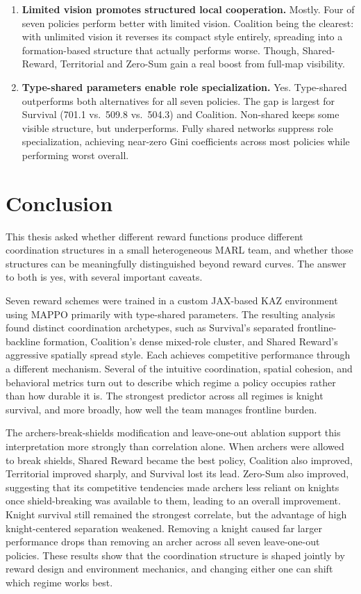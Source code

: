 \begin{enumerate}
    \item \textbf{Limited vision promotes structured local cooperation.}
    Mostly. Four of seven policies perform better with limited vision. Coalition being the clearest: with unlimited vision it reverses its compact style entirely, spreading into a formation-based structure that actually performs worse. Though, Shared-Reward, Territorial and Zero-Sum gain a real boost from full-map visibility.

    \item \textbf{Type-shared parameters enable role specialization.}
    Yes. Type-shared outperforms both alternatives for all seven policies. The gap is largest for Survival (701.1 vs.\ 509.8 vs.\ 504.3) and Coalition. Non-shared keeps some visible structure, but underperforms. Fully shared networks suppress role specialization, achieving near-zero Gini coefficients across most policies while performing worst overall.
\end{enumerate}

\chapter{Conclusion}
\label{chap:conclusion}
This thesis asked whether different reward functions produce different coordination structures in a small heterogeneous MARL team, and whether those structures can be meaningfully distinguished beyond reward curves. The answer to both is yes, with several important caveats.

Seven reward schemes were trained in a custom JAX-based KAZ environment using MAPPO primarily with type-shared parameters. The resulting analysis found distinct coordination archetypes, such as Survival's separated frontline-backline formation, Coalition's dense mixed-role cluster, and Shared Reward's aggressive spatially spread style. Each achieves competitive performance through a different mechanism. Several of the intuitive coordination, spatial cohesion, and behavioral metrics turn out to describe which regime a policy occupies rather than how durable it is. The strongest predictor across all regimes is knight survival, and more broadly, how well the team manages frontline burden.

The archers-break-shields modification and leave-one-out ablation support this interpretation more strongly than correlation alone. When archers were allowed to break shields, Shared Reward became the best policy, Coalition also improved, Territorial improved sharply, and Survival lost its lead. Zero-Sum also improved, suggesting that its competitive tendencies made archers less reliant on knights once shield-breaking was available to them, leading to an overall improvement. Knight survival still remained the strongest correlate, but the advantage of high knight-centered separation weakened. Removing a knight caused far larger performance drops than removing an archer across all seven leave-one-out policies. These results show that the coordination structure is shaped jointly by reward design and environment mechanics, and changing either one can shift which regime works best.

